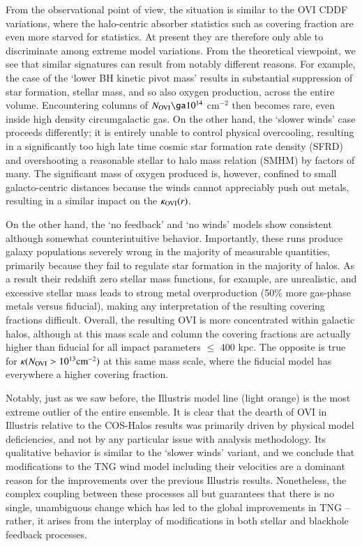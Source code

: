 \documentclass[useAMS,usenatbib]{mnras}
\newcommand{\ovi}{OVI\xspace}
\begin{document}
From the observational point of view, the situation is similar to the \ovi CDDF variations, where the halo-centric absorber statistics such as covering fraction are even more starved for statistics. At present they are therefore only able to discriminate among extreme model variations. From the theoretical viewpoint, we see that similar signatures can result from notably different reasons. For example, the case of the `lower BH kinetic pivot mass' results in substantial suppression of star formation, stellar mass, and so also oxygen production, across the entire volume. Encountering columns of $N_{\rm OVI} \ga 10^{14}$ cm$^{-2}$ then becomes rare, even inside high density circumgalactic gas. On the other hand, the `slower winds' case proceeds differently; it is entirely unable to control physical overcooling, resulting in a significantly too high late time cosmic star formation rate density (SFRD) and overshooting a reasonable stellar to halo mass relation (SMHM) by factors of many. The significant mass of oxygen produced is, however, confined to small galacto-centric distances because the winds cannot appreciably push out metals, resulting in a similar impact on the $\kappa_{\rm OVI}(r)$.

On the other hand, the `no feedback' and `no winds' models show consistent although somewhat counterintuitive behavior. Importantly, these runs produce galaxy populations severely wrong in the majority of measurable quantities, primarily because they fail to regulate star formation in the majority of halos. As a result their redshift zero stellar mass functions, for example, are unrealistic, and excessive stellar mass leads to strong metal overproduction (50\% more gas-phase metals versus fiducial), making any interpretation of the resulting covering fractions difficult. Overall, the resulting \ovi is more concentrated within galactic halos, although at this mass scale and column the covering fractions are actually higher than fiducial for all impact parameters $\le$ 400 kpc. The opposite is true for $\kappa (N_{\rm OVI} > 10^{13} \rm{cm}^{-2})$ at this same mass scale, where the fiducial model has everywhere a higher covering fraction.

Notably, just as we saw before, the Illustris model line (light orange) is the most extreme outlier of the entire ensemble. It is clear that the dearth of \ovi in Illustris relative to the COS-Halos results \citep[explored in][]{suresh15} was primarily driven by physical model deficiencies, and not by any particular issue with analysis methodology. Its qualitative behavior is similar to the `slower winds' variant, and we conclude that modifications to the TNG wind model including their velocities are a dominant reason for the improvements over the previous Illustris results. Nonetheless, the complex coupling between these processes all but guarantees that there is no single, unambiguous change which has led to the global improvements in TNG -- rather, it arises from the interplay of modifications in both stellar and blackhole feedback processes.
\end{document}
